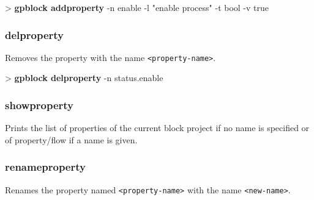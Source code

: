 \documentclass[10pt,a4paper]{article}
\begin{document}
\begin{sampletitle}
> \textbf{gpblock addproperty} -n enable -l "enable process" -t bool -v true
\end{sampletitle}


\subsubsection{delproperty}
\label{subsec:delproperty}

Removes the property with the name \texttt{<property-name>}.\\


\begin{sampletitle}
> \textbf{gpblock delproperty} -n status.enable
\end{sampletitle}


\subsubsection{showproperty}
\label{subsec:showproperty}

Prints the list of properties of the current block project if no name is specified or of property/flow if a name is given.

\subsubsection{renameproperty}
\label{subsec:renameproperty}

Renames the property named \texttt{<property-name>} with the name \texttt{<new-name>}.\\
\end{document}
